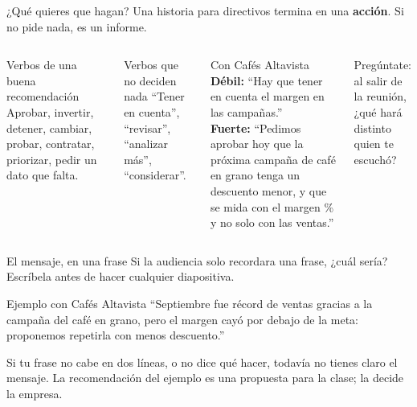 \documentclass[aspectratio=169,11pt]{beamer}
\begin{document}
\begin{frame}[t]{¿Qué quieres que hagan?}
  \small Una historia para directivos termina en una \textbf{acción}. Si no
  pide nada, es un informe.
  \vspace{0.15cm}
  \begin{columns}[T,onlytextwidth]
    \begin{block}{Verbos de una buena recomendación}
      \footnotesize Aprobar, invertir, detener, cambiar, probar, contratar,
      priorizar, pedir un dato que falta.
    \end{block}
    \begin{alertblock}{Verbos que no deciden nada}
      \footnotesize ``Tener en cuenta'', ``revisar'', ``analizar más'',
      ``considerar''.
    \end{alertblock}
    \begin{exampleblock}{Con Cafés Altavista}
      \footnotesize \textbf{Débil:} ``Hay que tener en cuenta el margen en
      las campañas.''\\[4pt]
      \textbf{Fuerte:} ``Pedimos aprobar hoy que la próxima campaña de café
      en grano tenga un descuento menor, y que se mida con el margen \% y
      no solo con las ventas.''
    \end{exampleblock}
    \footnotesize Pregúntate: al salir de la reunión, ¿qué hará distinto
    quien te escuchó?
  \end{columns}
\end{frame}

\begin{frame}[t]{El mensaje, en una frase}
  \small Si la audiencia solo recordara una frase, ¿cuál sería? Escríbela
  antes de hacer cualquier diapositiva.
  \vspace{0.15cm}
  \begin{center}
  \end{center}
  \begin{exampleblock}{Ejemplo con Cafés Altavista}
    \small ``Septiembre fue récord de ventas gracias a la campaña del café
    en grano, pero el margen cayó por debajo de la meta: proponemos
    repetirla con menos descuento.''
  \end{exampleblock}
  \footnotesize Si tu frase no cabe en dos líneas, o no dice qué hacer,
  todavía no tienes claro el mensaje. La recomendación del ejemplo es una
  propuesta para la clase; la decide la empresa.
\end{frame}
\end{document}
